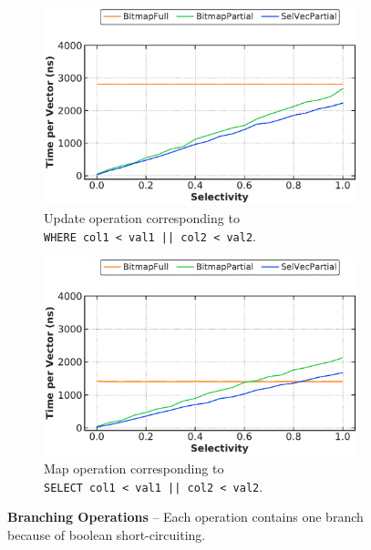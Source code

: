 \documentclass[12pt]{cmuthesis}
\begin{document}
\begin{figure}[t!]
\begin{subfigure}[t]{.49\linewidth}
 \includegraphics[width=0.9\linewidth]{eval/logical_or_update.pdf}
 \caption{Update operation corresponding to \\ \texttt{\footnotesize WHERE col1 < val1 || col2 < val2}.}
  \label{fig:logical_or_update}
\end{subfigure}%
\begin{subfigure}[t]{.49\linewidth}
 \centering
 \includegraphics[width=0.9\linewidth]{eval/logical_or_map.pdf}
 \caption{Map operation corresponding to \\ \texttt{\footnotesize SELECT col1 < val1 || col2 < val2}.}
  \label{fig:logical_or_map}
\end{subfigure}

\caption{\textbf{Branching Operations} -- Each operation contains one branch because of boolean short-circuiting.}
\label{fig:logical_map_update}
\end{figure}
\end{document}
